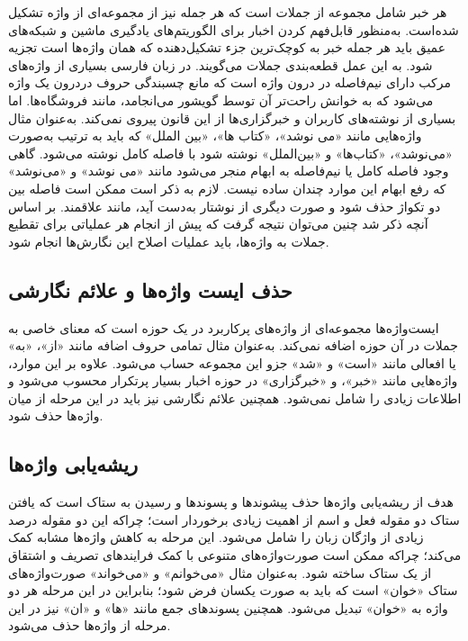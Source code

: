 	هر خبر شامل مجموعه از جملات است که هر جمله نیز از مجموعه‌ای از واژه تشکیل شده‌است. به‌منظور قابل‌فهم کردن اخبار برای الگوریتم‌های یادگیری ماشین و شبکه‌های عمیق باید هر جمله خبر به کوچک‌ترین جزء تشکیل‌دهنده که همان واژه‌ها است تجزیه شود. به این عمل قطعه‌بندی جملات می‌گویند. در زبان فارسی بسیاری از واژه‌های مرکب دارای نیم‌فاصله در درون واژه است که مانع چسبندگی حروف دردرون یک واژه می‌شود که به خوانش راحت‌تر آن توسط گویشور می‌انجامد، مانند فروشگاه‌ها. اما بسیاری از نوشته‌های کاربران و خبرگزاری‌ها از این قانون پیروی نمی‌کند. به‌عنوان مثال واژه‌هایی مانند «می نوشد»، «کتاب ها»، «بین الملل» که باید به ترتیب به‌صورت «می‌نوشد»، «کتاب‌ها» و «بین‌الملل» نوشته شود با فاصله کامل نوشته می‌شود. گاهی وجود فاصله کامل یا نیم‌فاصله به ابهام منجر می‌شود مانند «می نوشد» و «می‌نوشد» که رفع ابهام این موارد چندان ساده نیست. لازم به ذکر است ممکن است فاصله بین دو تکواژ حذف شود و صورت دیگری از نوشتار به‌دست آید، مانند علاقمند. بر اساس آنچه ذکر شد چنین می‌توان نتیجه گرفت که پیش از انجام هر عملیاتی برای تقطیع جملات به واژه‌ها، باید عملیات اصلاح این نگارش‌ها انجام شود.

\subsection[حذف ایست‌واژه‌ها و علائم نگارشی]{حذف ایست واژه‌ها و علائم نگارشی}
 ایست‌واژه‌ها مجموعه‌ای از واژه‌های پرکاربرد در یک حوزه است که معنای خاصی به جملات در آن حوزه اضافه نمی‌کند. به‌عنوان مثال تمامی حروف اضافه مانند «از»، «به» یا افعالی مانند «است» و «شد» جزو این مجموعه حساب می‌شود. علاوه بر این موارد، واژه‌هایی مانند «خبر»، و «خبرگزاری» در حوزه اخبار بسیار پرتکرار محسوب می‌شود و اطلاعات زیادی را شامل نمی‌شود. همچنین علائم نگارشی نیز باید در این مرحله از میان واژه‌ها حذف شود.
 
\subsection[ریشه‌یابی واژه‌ها]{ریشه‌یابی واژه‌ها}
هدف از ریشه‌یابی واژه‌ها حذف پیشوندها و پسوندها و رسیدن به ستاک است که یافتن ستاک دو مقوله فعل و اسم از اهمیت زیادی برخوردار است؛ چراکه این دو مقوله درصد زیادی از واژگان زبان را شامل می‌شود. این مرحله به کاهش واژه‌ها مشابه کمک می‌کند؛ چراکه ممکن است صورت‌واژه‌های متنوعی با کمک فرایندهای تصریف و اشتقاق از یک ستاک ساخته شود. به‌عنوان مثال «می‌خوانم» و «می‌خواند» صورت‌واژه‌های ستاک «خوان» است که باید به صورت یکسان فرض شود؛ بنابراین در این مرحله هر دو واژه به «خوان» تبدیل می‌شود. همچنین پسوندهای جمع مانند «ها» و «ان» نیز در این مرحله از واژه‌ها حذف می‌شود.

